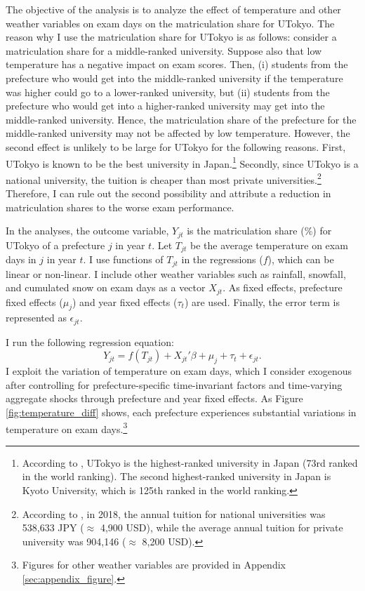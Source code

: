 \documentclass[12pt,letterpaper]{article}
\begin{document}
The objective of the analysis is to analyze the effect of temperature and other weather variables on exam days on the matriculation share for UTokyo.
The reason why I use the matriculation share for UTokyo is as follows:
consider a matriculation share for a middle-ranked university.
Suppose also that low temperature has a negative impact on exam scores.
Then, 
(i) students from the prefecture who would get into the middle-ranked university if the temperature was higher could go to a lower-ranked university, but
(ii) students from the prefecture who would get into a higher-ranked university may get into the middle-ranked university.
Hence, the matriculation share of the prefecture for the middle-ranked university may not be affected by low temperature.
However, the second effect is unlikely to be large for UTokyo for the following reasons.
First, UTokyo is known to be the best university in Japan.\footnote{
  According to \citet{usnews}, UTokyo is the highest-ranked university in Japan (73rd ranked in the world ranking).
  The second highest-ranked university in Japan is Kyoto University, which is 125th ranked in the world ranking.
}
Secondly, since UTokyo is a national university, the tuition is cheaper than most private universities.\footnote{
  According to \citet{mext}, in 2018, the annual tuition for national universities was 538,633 JPY ($\approx$ 4,900 USD), while the average annual tuition for private university was 904,146 ($\approx$ 8,200 USD).
}
Therefore, I can rule out the second possibility and attribute a reduction in matriculation shares to the worse exam performance.

In the analyses, the outcome variable, $Y_{jt}$ is the matriculation share (\%) for UTokyo of a prefecture $j$ in year $t$.
Let $T_{jt}$ be the average temperature on exam days in $j$ in year $t$.
I use functions of $T_{jt}$ in the regressions ($f$), which can be linear or non-linear.
I include other weather variables such as rainfall, snowfall, and cumulated snow on exam days as a vector $X_{jt}$.
As fixed effects, prefecture fixed effects ($\mu_j$) and year fixed effects ($\tau_t$) are used.
Finally, the error term is represented as $\epsilon_{jt}$.

I run the following regression equation:
\begin{equation*}
  Y_{jt} = f(T_{jt}) + X_{jt}' \beta + \mu_j + \tau_t + \epsilon_{jt}.
\end{equation*}
I exploit the variation of temperature on exam days, which I consider exogenous after controlling for prefecture-specific time-invariant factors and time-varying aggregate shocks through prefecture and year fixed effects.
As Figure \ref{fig:temperature_diff} shows, each prefecture experiences substantial variations in temperature on exam days.\footnote{
  Figures for other weather variables are provided in Appendix \ref{sec:appendix_figure}.
}
\end{document}
